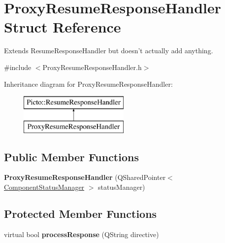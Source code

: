 \hypertarget{struct_proxy_resume_response_handler}{\section{Proxy\-Resume\-Response\-Handler Struct Reference}
\label{struct_proxy_resume_response_handler}
}


Extends Resume\-Response\-Handler but doesn't actually add anything.  




{\ttfamily \#include $<$Proxy\-Resume\-Response\-Handler.\-h$>$}

Inheritance diagram for Proxy\-Resume\-Response\-Handler\-:\begin{figure}[H]
\begin{center}
\leavevmode
\includegraphics[height=2.000000cm]{struct_proxy_resume_response_handler}
\end{center}
\end{figure}
\subsection*{Public Member Functions}
\begin{DoxyCompactItemize}
\item 
\hypertarget{struct_proxy_resume_response_handler_a51dd9417c6800e4ca18d0ea5e42d177c}{{\bfseries Proxy\-Resume\-Response\-Handler} (Q\-Shared\-Pointer$<$ \hyperlink{class_component_status_manager}{Component\-Status\-Manager} $>$ status\-Manager)}\label{struct_proxy_resume_response_handler_a51dd9417c6800e4ca18d0ea5e42d177c}

\end{DoxyCompactItemize}
\subsection*{Protected Member Functions}
\begin{DoxyCompactItemize}
\item 
\hypertarget{struct_proxy_resume_response_handler_acb37a573c711418f62fc8575f8519926}{virtual bool {\bfseries process\-Response} (Q\-String directive)}\label{struct_proxy_resume_response_handler_acb37a573c711418f62fc8575f8519926}

\end{DoxyCompactItemize}


